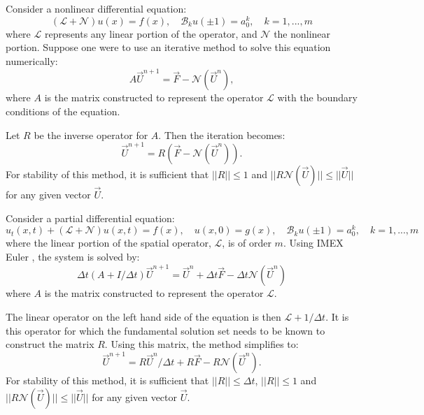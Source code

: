 \documentclass{sfuthesis}
\begin{document}
Consider a nonlinear differential equation:
\begin{equation}
(\mathcal{L} + \mathcal{N}) u(x) = f(x), \quad \mathcal{B}_k u(\pm 1) = a_0^k, \quad k = 1,...,m 
\end{equation}
where $\mathcal{L}$ represents any linear portion of the operator, and $\mathcal{N}$ the nonlinear portion.
Suppose one were to use an iterative method to solve this equation numerically:
\begin{equation}
A \vec{U}^{n+1} = \vec{F} - \mathcal{N} (\vec{U}^n) ,
\end{equation}
where $A$ is the matrix constructed to represent the operator $\mathcal{L}$ with the boundary conditions of the equation.

Let $R$ be the inverse operator for $A$.
Then the iteration becomes:
\begin{equation}
\vec{U}^{n+1} = R (\vec{F} - \mathcal{N}( \vec{U}^n ) ).
\end{equation}
For stability of this method, it is sufficient that $||R|| \leq 1$ and $||R \mathcal{N} (\vec{U})|| \leq || \vec{U} ||$ for any given vector $\vec{U}$.

Consider a partial differential equation:
\begin{equation}
u_t(x,t) + (\mathcal{L} + \mathcal{N}) u(x,t) = f(x), \quad u(x,0) = g(x), \quad \mathcal{B}_k u(\pm 1) = a_0^k, \quad k = 1,...,m 
\end{equation}
where the linear portion of the spatial operator, $\mathcal{L}$, is of order $m$.
Using IMEX Euler \cite{Ruuth, Leveque}, the system is solved by:
\begin{equation}
\Delta t (A + I/\Delta t) \vec{U}^{n+1} = \vec{U}^n + \Delta t \vec{F} - \Delta t \mathcal{N}( \vec{U}^n ) 
\end{equation}
where $A$ is the matrix constructed to represent the operator $\mathcal{L}$.

The linear operator on the left hand side of the equation is then $\mathcal{L} + 1/\Delta t$.
It is this operator for which the fundamental solution set needs to be known to construct the matrix $R$.
Using this matrix, the method simplifies to:
\begin{equation}
\vec{U}^{n+1} = R \vec{U}^n / \Delta t + R \vec{F} - R \mathcal{N}(\vec{U}^n) .
\end{equation}
For stability of this method, it is sufficient that $||R|| \leq \Delta t$, $||R|| \leq 1$ and $||R \mathcal{N} (\vec{U})|| \leq || \vec{U} ||$ for any given vector $\vec{U}$.
\end{document}
